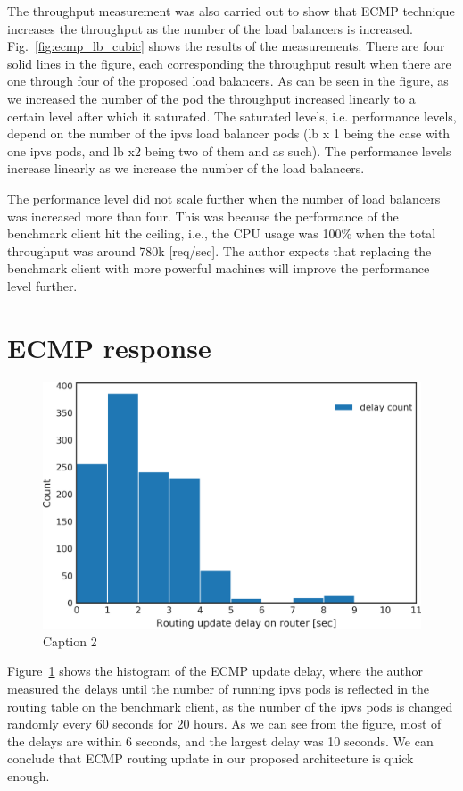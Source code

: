 The throughput measurement was also carried out to show that ECMP technique increases the throughput as the number of the load balancers is increased.
Fig.~\ref{fig:ecmp_lb_cubic} shows the results of the measurements.
There are four solid lines in the figure, each corresponding the throughput result when there are one through four of the proposed load balancers.
As can be seen in the figure, as we increased the number of the pod the throughput increased linearly to a certain level after which it saturated.
The saturated levels, i.e. performance levels, depend on the number of the ipvs load balancer pods (lb x 1 being the case with one ipvs pods, and lb x2 being two of them and as such).
The performance levels increase linearly as we increase the number of the load balancers.

The performance level did not scale further when the number of load balancers was increased more than four.
This was because the performance of the benchmark client hit the ceiling, i.e., the CPU usage was 100\% when the total throughput was around 780k [req/sec].
The author expects that replacing the benchmark client with more powerful machines will improve the performance level further.

\FloatBarrier

\section{ECMP response}

\begin{figure}[t]
  \includegraphics[width=0.9\columnwidth,left]{Figs/ecmp_delay_histgram}
  \caption{Caption 2}
  \label{fig:ecmp_delay_histgram}
\end{figure}

Figure~\ref{fig:ecmp_delay_histgram} shows the histogram of the ECMP update delay, where the author measured the delays until the number of running ipvs pods is reflected in the routing table on the benchmark client, as the number of the ipvs pods is changed randomly every 60 seconds for 20 hours.
As we can see from the figure, most of the delays are within 6 seconds, and the largest delay was 10 seconds.
We can conclude that ECMP routing update in our proposed architecture is quick enough.

